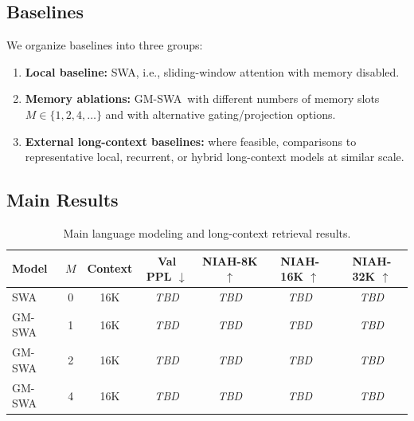 \documentclass{article}
\newcommand{\model}{GM-SWA}
\newcommand{\baseline}{SWA}
\newcommand{\todoresult}{\textit{TBD}}
\begin{document}
\subsection{Baselines}

We organize baselines into three groups:
\begin{enumerate}
    \item \textbf{Local baseline:} \baseline, i.e., sliding-window attention with memory disabled.
    \item \textbf{Memory ablations:} \model\ with different numbers of memory slots $M \in \{1,2,4,\dots\}$ and with alternative gating/projection options.
    \item \textbf{External long-context baselines:} where feasible, comparisons to representative local, recurrent, or hybrid long-context models at similar scale.
\end{enumerate}

\subsection{Main Results}

\begin{table}[t]
    \centering
    \caption{Main language modeling and long-context retrieval results.}
    \label{tab:main_results}
    \begin{tabular}{lcccccc}
        \toprule
        Model & $M$ & Context & Val PPL $\downarrow$ & NIAH-8K $\uparrow$ & NIAH-16K $\uparrow$ & NIAH-32K $\uparrow$ \\
        \midrule
        \baseline & 0 & 16K & \todoresult & \todoresult & \todoresult & \todoresult \\
        \model & 1 & 16K & \todoresult & \todoresult & \todoresult & \todoresult \\
        \model & 2 & 16K & \todoresult & \todoresult & \todoresult & \todoresult \\
        \model & 4 & 16K & \todoresult & \todoresult & \todoresult & \todoresult \\
        \bottomrule
    \end{tabular}
\end{table}
\end{document}
